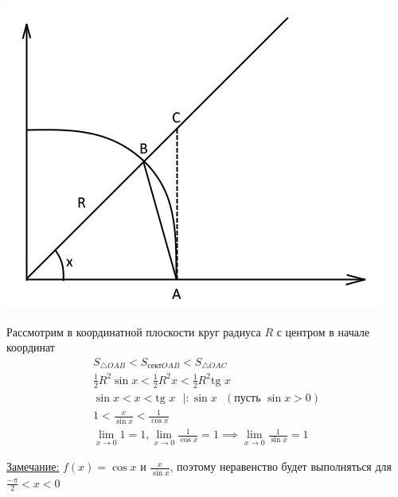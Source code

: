 \documentclass[12pt]{article}
\begin{document}
    \begin{adjustwidth}{1.5em}{1.5em}
        \begin{center}
            \includegraphics{3.5.1}
        \end{center}
        Рассмотрим в координатной плоскости круг радиуса $R$ с центром в начале координат\\
        \begin{gather*} 
            S_{\triangle OAB} < S_{\text{сект}OAB} < S_{\triangle OAC}\\
            \frac{1}{2}R^2\sin x < \frac{1}{2}R^2 x < \frac{1}{2} R^2 \text{tg } x\\
            \sin x < x < \text{tg } x \text{ } \big| : \sin x \text{ } (\text{пусть } \sin x > 0)\\
            1 < \frac{x}{\sin x} < \frac{1}{\cos x}\\
            \lim_{x\to 0} 1 = 1, \lim_{x\to 0} \frac{1}{\cos x} = 1 \implies \lim_{x\to 0} \frac{1}{\sin x} = 1
        \end{gather*}
        \begin{center}
            \underline{Замечание:} $f(x) = \cos x$ и $\frac{x}{\sin x}$, поэтому неравенство будет выполняться для $\frac{-\pi}{2} < x < 0$
        \end{center}
    \end{adjustwidth}
\end{document}
